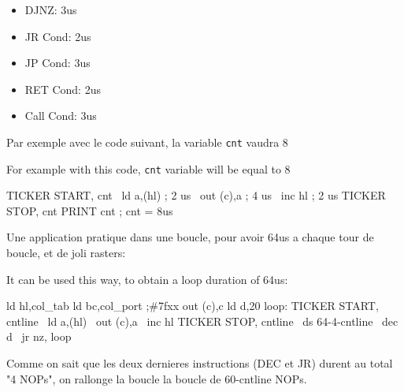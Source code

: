 \begin{itemize}
\item DJNZ: 3us 
\item JR Cond: 2us 
\item JP Cond: 3us 
\item RET Cond: 2us
\item Call Cond: 3us
\end{itemize}

\begin{xfr}
Par exemple avec le code suivant, la variable \texttt{cnt} vaudra 8
\end{xfr}

\begin{xen}
For example with this code, \texttt{cnt} variable will be equal to 8
\end{xen}

\begin{code}
TICKER START, cnt
\ ld a,(hl)   ; 2 us
\ out (c),a   ; 4 us
\ inc hl      ; 2 us
TICKER STOP, cnt
PRINT cnt     ; cnt = 8us
\end{code}

\begin{xfr}
Une application pratique dans une boucle, pour avoir 64us a chaque tour de boucle, et de joli rasters:
\end{xfr}
\begin{xen}
It can be used this way, to obtain a loop duration of 64us:
\end{xen}

\begin{code}
ld hl,col\_tab
ld bc,col\_port  ;\#7fxx
out (c),c
ld d,20
loop:
TICKER START, cntline
\ ld a,(hl)
\ out (c),a
\ inc hl
TICKER STOP, cntline
\ ds 64-4-cntline
\ dec d
\	jr nz, loop
\end{code}

\begin{xfr}
Comme on sait que les deux dernieres instructions (DEC et JR) durent au total "4 NOPs", on rallonge la boucle la boucle de 60-cntline NOPs.
\end{xfr}
